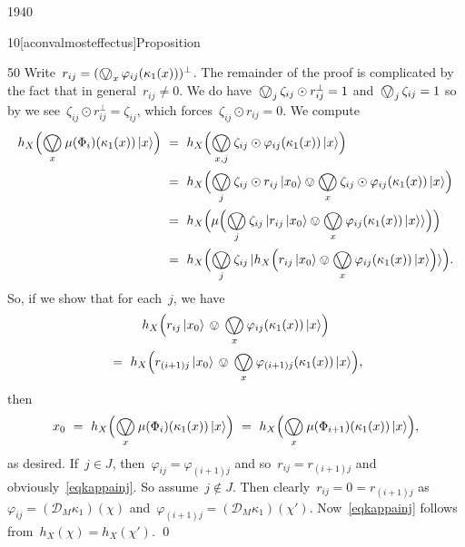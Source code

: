 \begin{parsec}{1940}
\begin{point}{10}[aconvalmosteffectus]{Proposition}
\begin{point}{50}
Write~$r_{ij} = (\bigovee_x \varphi_{ij}(\kappa_1(x)))^\perp$.
The remainder of the proof is complicated
    by the fact that in general~$r_{ij} \neq 0$.
    We do have~$\bigovee_j \zeta_{ij} \odot r^\perp_{ij} = 1$
        and~$\bigovee_j \zeta_{ij} = 1$
        so by 
        we see~$\zeta_{ij} \odot r^\perp_{ij} = \zeta_{ij}$,
        which  forces~$\zeta_{ij} \odot r_{ij} = 0$.
We compute
\begin{align*}
    h_X\Bigl(\bigovee_x \mu(\Phi_i) (\kappa_1(x)) \ket{x}\Bigr) 
    &\ = \ 
    h_X \Bigl( \bigovee_{x,j} \zeta_{ij} \odot \varphi_{ij}
        (\kappa_1(x)) \ket{x} \Bigr) \\
        &\ = \ 
    h_X \Bigl(
    \bigovee_{j} \zeta_{ij} \odot r_{ij} \ket{x_0} \ovee \bigovee_x
    \zeta_{ij} \odot \varphi_{ij}
        (\kappa_1(x)) \ket{x} \Bigr) \\
        & \ = \ h_X \Bigl(
    \mu\Bigl( \bigovee_j \zeta_{ij} \ket{
        r_{ij} \ket{x_0} \ovee \bigovee_x \varphi_{ij} (\kappa_1 (x)) \ket{x}
    }
    \Bigr)
    \Bigr) \\
        & \ = \ h_X \Bigl(
    \bigovee_j \zeta_{ij} \ket{
        h_X\Bigl(
        r_{ij} \ket{x_0} \ovee \bigovee_x \varphi_{ij} (\kappa_1 (x)) \ket{x}
    \Bigr)
}
    \Bigr).
\end{align*}
So, if we show that for each~$j$,
    we have
\begin{multline}\label{eqkappainj}
        h_X\Bigl(
        r_{ij} \ket{x_0} \, \ovee \,\bigovee_x \varphi_{ij} (\kappa_1 (x)) \ket{x}
    \Bigr) \\
    \  = \  
        h_X\Bigl(
        r_{(i+1)j} \ket{x_0} \,\ovee \,\bigovee_x \varphi_{(i+1)j} (\kappa_1 (x)) \ket{x}
    \Bigr),
\end{multline}
then
\begin{equation*}
    x_0 \ = \ h_X\Bigl(\bigovee_x \mu(\Phi_i) (\kappa_1(x)) \ket{x}\Bigr) 
    \ =\  h_X\Bigl(\bigovee_x \mu(\Phi_{i+1}) (\kappa_1(x)) \ket{x}\Bigr),
\end{equation*}
as desired.
If~$j \in J$,
then~$\varphi_{ij} = \varphi_{(i+1)j}$
and so~$r_{ij} = r_{(i+1)j}$
and obviously~\eqref{eqkappainj}.
So assume~$j \notin J$.
Then clearly~$r_{ij} = 0 = r_{(i+1)j}$
as~$\varphi_{ij} = (\mathcal{D}_M \kappa_1)(\chi)$
    and~$\varphi_{(i+1)j} = (\mathcal{D}_M \kappa_1) (\chi')$.
Now~\eqref{eqkappainj} follows from~$h_X(\chi) = h_X(\chi')$. \qed
\end{point}
\end{point}
\end{parsec}

